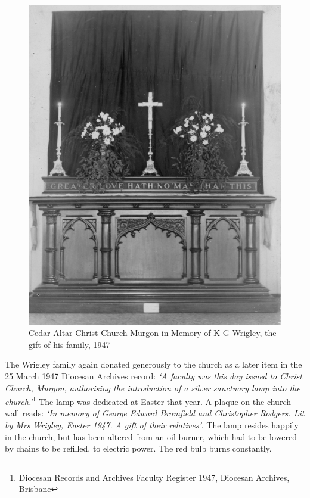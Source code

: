 \begin{figure}
\begin{center}
\includegraphics[width=1.\linewidth,center]{../images/cedarAltar1947.jpg}
\caption{Cedar Altar Christ Church Murgon in Memory of K G Wrigley, the gift of his family, 1947}
\end{center}
\end{figure}




The Wrigley family again donated generously to the church as a later item in the 25 March 1947 Diocesan Archives record: \emph{`A faculty was this day issued to Christ Church, Murgon, authorising the introduction of a silver sanctuary lamp into the church.'}\footnote{Diocesan Records and Archives Faculty Register 1947, Diocesan Archives, Brisbane} The lamp was dedicated at Easter that year. A plaque on the church wall reads: \emph{`In memory of George Edward Bromfield and Christopher Rodgers. Lit by Mrs Wrigley, Easter 1947. A gift of their relatives'}. The lamp resides happily in the church, but has been altered from an oil burner, which had to be lowered by chains to be refilled, to electric power. The red bulb burns constantly.


